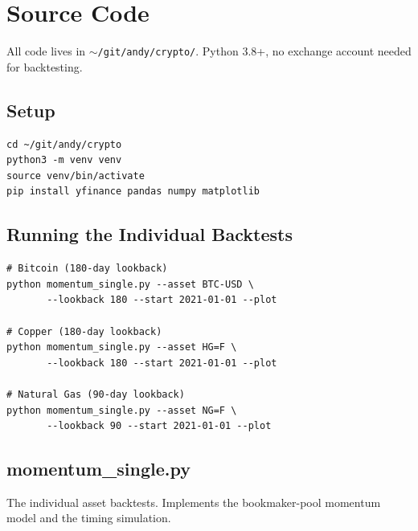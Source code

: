 \documentclass[11pt,a4paper]{article}
\begin{document}

\appendix

\section{Source Code}

All code lives in \texttt{$\sim$/git/andy/crypto/}. Python 3.8+,
no exchange account needed for backtesting.

\subsection{Setup}

\begin{codebox}[Shell]
\begin{lstlisting}[style=shell]
cd ~/git/andy/crypto
python3 -m venv venv
source venv/bin/activate
pip install yfinance pandas numpy matplotlib
\end{lstlisting}
\end{codebox}

\subsection{Running the Individual Backtests}

\begin{codebox}[Shell]
\begin{lstlisting}[style=shell]
# Bitcoin (180-day lookback)
python momentum_single.py --asset BTC-USD \
       --lookback 180 --start 2021-01-01 --plot

# Copper (180-day lookback)
python momentum_single.py --asset HG=F \
       --lookback 180 --start 2021-01-01 --plot

# Natural Gas (90-day lookback)
python momentum_single.py --asset NG=F \
       --lookback 90 --start 2021-01-01 --plot
\end{lstlisting}
\end{codebox}

\subsection{momentum\_single.py}

The individual asset backtests. Implements the bookmaker-pool
momentum model and the timing simulation.
\end{document}
